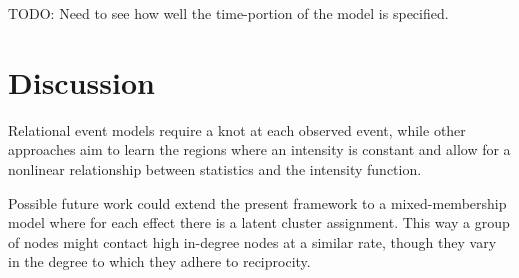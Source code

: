 \documentclass{article}
\begin{document}
TODO: Need to see how well the time-portion of the model is specified.

\section{Discussion}
Relational event models \cite{Butts2008} require a knot at each observed event, while other approaches \cite{Gunawardana2011} aim to learn the regions where an intensity is constant and allow for a nonlinear relationship between statistics and the intensity function.  

Possible future work could extend the present framework to a mixed-membership model where for each effect there is a latent cluster assignment.  This way a group of nodes might contact high in-degree nodes at a similar rate, though they vary in the degree to which they adhere to reciprocity.








\end{document}
